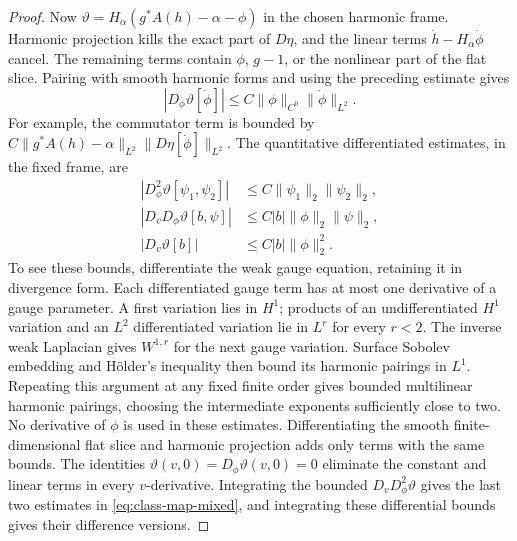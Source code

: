 \documentclass[11pt]{amsart}
\theoremstyle{definition}
\theoremstyle{remark}
\theoremstyle{plain}
\numberwithin{equation}{section}
\begin{document}
\begin{proof}
Now $\vartheta=H_\alpha(g^*A(h)-\alpha-\phi)$ in the chosen
harmonic frame. Harmonic projection kills the exact part of
$D\eta$, and the linear terms $\dot h-H_\alpha\dot\phi$ cancel.
The remaining terms contain $\phi$, $g-1$, or the nonlinear part
of the flat slice. Pairing with smooth harmonic forms and using
the preceding estimate gives
\begin{equation}\label{eq:class-map-L2}
|D_\phi\vartheta[\dot\phi]|
 \le C\|\phi\|_{C^0}\|\dot\phi\|_{L^2}.
\end{equation}
For example, the commutator term is bounded by
$C\|g^*A(h)-\alpha\|_{L^2}\|D\eta[\dot\phi]\|_{L^2}$.
The quantitative differentiated estimates, in the fixed frame, are
\begin{align}
|D_\phi^2\vartheta[\psi_1,\psi_2]|&\le
 C\|\psi_1\|_2\|\psi_2\|_2,\nonumber\\
|D_vD_\phi\vartheta[b,\psi]|&\le
 C|b|\|\phi\|_2\|\psi\|_2,\nonumber\\
|D_v\vartheta[b]|&\le C|b|\|\phi\|_2^2.
\label{eq:class-map-mixed}
\end{align}
To see these bounds, differentiate the weak gauge equation, retaining
it in divergence form. Each differentiated gauge term has at most
one derivative of a gauge parameter. A first variation lies in
$H^1$; products of an undifferentiated $H^1$ variation and an
$L^2$ differentiated variation lie in $L^r$ for every $r<2$.
The inverse weak Laplacian gives $W^{1,r}$ for the next gauge
variation. Surface Sobolev embedding and H\"older's inequality
then bound its harmonic pairings in $L^1$. Repeating this argument
at any fixed finite order gives bounded multilinear harmonic
pairings, choosing the intermediate exponents sufficiently close
to two. No derivative of $\phi$ is used in these estimates.
Differentiating the smooth finite-dimensional flat slice and
harmonic projection adds only terms with the same bounds. The
identities $\vartheta(v,0)=D_\phi\vartheta(v,0)=0$ eliminate the
constant and linear terms in every $v$-derivative. Integrating the
bounded $D_vD_\phi^2\vartheta$ gives the last two estimates in
\eqref{eq:class-map-mixed}, and integrating these differential
bounds gives their difference versions.


\end{proof}
\end{document}
